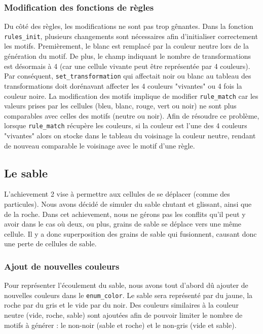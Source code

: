 \documentclass[a4paper]{article}
\begin{document}
\subsubsection{Modification des fonctions de règles}
Du côté des règles, les modifications ne sont pas trop gênantes. Dans la fonction \texttt{rules\_init}, plusieurs changements sont nécessaires afin d'initialiser correctement les motifs. Premièrement, le blanc est remplacé par la couleur neutre lors de la génération du motif. De plus, le champ indiquant le nombre de transformations est désormais à 4 (car une cellule vivante peut être représentée par 4 couleurs). Par conséquent, \texttt{set\_transformation} qui affectait noir ou blanc au tableau des transformations doit dorénavant affecter les 4 couleurs "vivantes" ou 4 fois la couleur noire. La modification des motifs implique de modifier \texttt{rule\_match} car les valeurs prises par les cellules (bleu, blanc, rouge, vert ou noir) ne sont plus comparables avec celles des motifs (neutre ou noir). Afin de résoudre ce problème, lorsque \texttt{rule\_match} récupère les couleurs, si la couleur est l'une des 4 couleurs "vivantes" alors on stocke dans le tableau du voisinage la couleur neutre, rendant de nouveau comparable le voisinage avec le motif d'une règle.

\subsection{Le sable}
L'achievement 2 vise à permettre aux cellules de se déplacer (comme des particules). Nous avons décidé de simuler du sable chutant et glissant, ainsi que de la roche. Dans cet achievement, nous ne gérons pas les conflits qu'il peut y avoir dans le cas où deux, ou plus, grains de sable se déplace vers une même cellule. Il y a donc superposition des grains de sable qui fusionnent, causant donc une perte de cellules de sable.  

\subsubsection{Ajout de nouvelles couleurs}
Pour représenter l'écoulement du sable, nous avons tout d'abord dû ajouter de nouvelles couleurs dans le \texttt{enum\_color}. Le sable sera représenté par du jaune, la roche par du gris et le vide par du noir. Des couleurs similaires à la couleur neutre (vide, roche, sable) sont ajoutées afin de pouvoir limiter le nombre de motifs à générer : le non-noir (sable et roche) et le non-gris (vide et sable).
\end{document}
